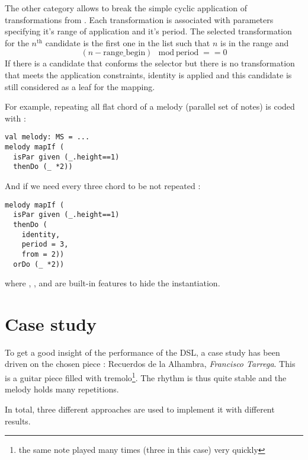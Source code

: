 \documentclass[twocolumn, 11pt]{article}
\begin{document}
The other category allows to break the simple cyclic application of transformations from . Each transformation is associated with parameters specifying it's range of application and it's period. The selected transformation for the $n^{\text{th}}$ candidate is the first one in the list such that $n$ is in the range and
$$(n - \text{range\_begin}) \mod \text{period} == 0$$
If there is a candidate that conforms the selector but there is no transformation that meets the application constraints, identity is applied and this candidate is still considered as a leaf for the mapping.



For example, repeating all flat chord of a melody (parallel set of notes) is coded with :
\begin{lstlisting}
val melody: MS = ...
melody mapIf (
  isPar given (_.height==1)
  thenDo (_ *2))
\end{lstlisting}
And if we need every three chord to be not repeated :
\begin{lstlisting}
melody mapIf (
  isPar given (_.height==1)
  thenDo (
    identity,
    period = 3,
    from = 2))
  orDo (_ *2))
\end{lstlisting}
where , ,  and  are built-in features to hide the  instantiation.



\section{Case study}
To get a good insight of the performance of the DSL, a case study has been driven on the chosen piece : Recuerdos de la Alhambra, \emph{Francisco Tarrega}. This is a guitar piece filled with tremolo\footnote{the same note played many times (three in this case) very quickly}. The rhythm is thus quite stable and the melody holds many repetitions.

In total, three different approaches are used to implement it with different results.
\end{document}
